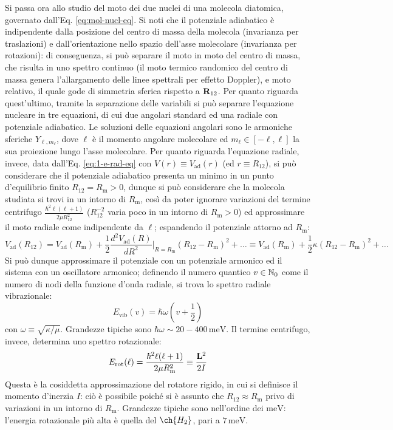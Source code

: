 Si passa ora allo studio del moto dei due nuclei di una molecola diatomica, governato dall'Eq. \ref{eq:mol-nucl-eq}. Si noti che il potenziale adiabatico è indipendente dalla posizione del centro di massa della molecola (invarianza per traslazioni) e dall'orientazione nello spazio dell'asse molecolare (invarianza per rotazioni): di conseguenza, si può separare il moto in moto del centro di massa, che risulta in uno spettro continuo (il moto termico randomico del centro di massa genera l'allargamento delle linee spettrali per effetto Doppler), e moto relativo, il quale gode di simmetria sferica rispetto a $ \mathbf{R}_{12} $. Per quanto riguarda quest'ultimo, tramite la separazione delle variabili si può separare l'equazione nucleare in tre equazioni, di cui due angolari standard ed una radiale con potenziale adiabatico. Le soluzioni delle equazioni angolari sono le armoniche sferiche $ Y_{\ell,m_\ell} $, dove $ \ell $ è il momento angolare molecolare ed $ m_\ell \in [-\ell,\ell] $ la sua proiezione lungo l'asse molecolare. Per quanto riguarda l'equazione radiale, invece, data dall'Eq. \ref{eq:1-e-rad-eq} con $ V(r) \equiv V_\text{ad}(r) $ (ed $ r \equiv R_{12} $), si può considerare che il potenziale adiabatico presenta un minimo in un punto d'equilibrio finito $ R_{12} = R_\text{m} > 0 $, dunque si può considerare che la molecola studiata si trovi in un intorno di $ R_\text{m} $, così da poter ignorare variazioni del termine centrifugo $ \frac{\hbar^2 \ell (\ell + 1)}{2\mu R_{12}^2} $ ($ R_{12}^{-2} $ varia poco in un intorno di $ R_\text{m} > 0 $) ed approssimare il moto radiale come indipendente da $ \ell $; espandendo il potenziale attorno ad $ R_\text{m} $:
\begin{equation*}
	V_\text{ad}(R_{12}) = V_\text{ad}(R_\text{m}) + \frac{1}{2} \frac{d^2 V_\text{ad}(R)}{dR^2}\bigg\vert_{R = R_\text{m}} (R_{12} - R_\text{m})^2 + \dots \equiv V_\text{ad}(R_\text{m}) + \frac{1}{2} \kappa (R_{12} - R_\text{m})^2 + \dots
\end{equation*}
Si può dunque approssimare il potenziale con un potenziale armonico ed il sistema con un oscillatore armonico; definendo il numero quantico $ v \in \mathbb{N}_0 $ come il numero di nodi della funzione d'onda radiale, si trova lo spettro radiale vibrazionale:
\begin{equation}
	E_\text{vib}(v) = \hbar \omega \left( v + \frac{1}{2} \right)
\end{equation}
con $ \omega \equiv \sqrt{\kappa / \mu} $. Grandezze tipiche sono $ \hbar \omega \sim 20-400 \,\text{meV} $. Il termine centrifugo, invece, determina uno spettro rotazionale:
\begin{equation}
	E_\text{rot}(\ell) = \frac{\hbar^2 \ell (\ell + 1)}{2\mu R_\text{m}^2} \equiv \frac{\mathbf{L}^2}{2I}
\end{equation}
Questa è la cosiddetta approssimazione del rotatore rigido, in cui si definisce il momento d'inerzia $ I $: ciò è possibile poiché si è assunto che $ R_{12} \approx R_\text{m} $ privo di variazioni in un intorno di $ R_\text{m} $. Grandezze tipiche sono nell'ordine dei $ \text{meV} $: l'energia rotazionale più alta è quella del $ \ch{H_2} $, pari a $ 7 \,\text{meV} $.

